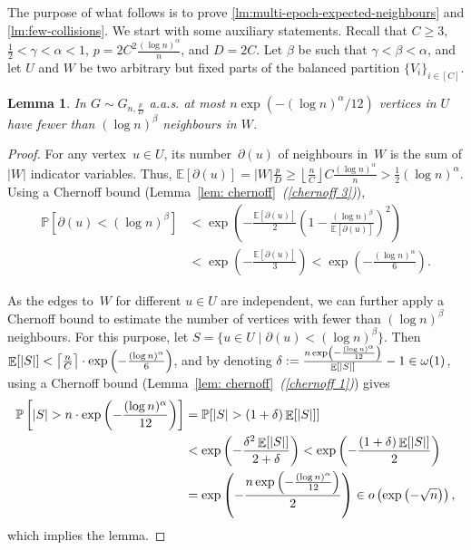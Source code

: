 \documentclass[a4paper,11pt]{article}
\makeatletter
\theoremstyle{definition}
\theoremstyle{plain}
\newtheorem{lemma}{Lemma}
\DeclareMathOperator{\E}{\mathbb{E}}
\newcommand{\prob}{\mathbb{P}}
\newcommand{\expect}{\mathbb{E}}
\newcommand{\aas}{a.a.s.\@\xspace}
\DeclarePairedDelimiter{\abs}{\lvert}{\rvert}
\makeatother
\begin{document}
The purpose of what follows is to prove \cref{lm:multi-epoch-expected-neighbours} and \cref{lm:few-collisions}. 
We start with some auxiliary statements.
Recall that $C \geq 3$, $\frac{1}{2}<\gamma<\alpha<1$, $p = 2C^2 \frac{(\log n)^\alpha}{n}$, and $D = 2C$. Let $\beta$ be such that $\gamma<\beta<\alpha$, and
let $U$ and $W$ be two arbitrary but fixed parts of the balanced partition $\{ V_i \}_{i \in [C]}$.

\begin{lemma}
	\label{lm:few-sleepers}
	In $G \sim G_{n, \frac{p}{D}}$ \aas
	at most $n \exp\left(-(\log n)^\alpha/12\right)$ vertices in $U$ have fewer than $(\log n)^\beta$ neighbours in $W$.
\end{lemma}

\begin{proof}
	For any vertex~$u \in U$, its number~$\partial(u)$ of neighbours in~$W$
	is the sum of $|W|$ indicator variables.
	Thus, 
	$\expect[\partial(u)] = |W| \frac{p}{D}\geq
	\left\lfloor\frac{n}{C}\right\rfloor C \frac{(\log n)^\alpha}{n} 
	>\frac{1}{2}(\log n)^\alpha$.
	Using a Chernoff bound (Lemma~\ref{lem: chernoff}~\emph{(\ref{chernoff 3})}),
	\begin{align*}
		\prob[\partial(u) < (\log n)^\beta]
		&< \exp \left( - \frac{\expect[\partial(u)]}{2} \left(1-\frac{(\log n)^\beta}{\expect[\partial(u)]}\right)^2 \right)
		\\ &< \exp \left( - \frac{\expect[\partial(u)]}{3}\right)
		< \exp \left( - \frac{(\log n)^\alpha}{6} \right).
	\end{align*}
	
	As the edges to~$W$ for different $u \in U$ are independent,
	we can further apply a Chernoff bound to estimate the number of vertices with fewer than $(\log n)^\beta$ neighbours.
	For this purpose, let $S=\{u \in U \mid  \partial(u) < (\log n)^\beta\}$.
	Then $\E[\abs{S}]<\left\lceil \frac{n}{C} \right\rceil \cdot \exp \left( - \frac{(\log n)^\alpha}{6}\right)$, and
	by denoting $\delta := \frac{n \exp \left( - \frac{(\log n)^\alpha}{12} \right)}{\E[\abs{S}]}-1 \in \omega(1)$,
	using a Chernoff bound (Lemma~\ref{lem: chernoff}~\emph{(\ref{chernoff 1})}) gives 
	\begin{align*}
		\prob\left[\abs{S}>n\cdot \exp \left( - \frac{(\log n)^\alpha}{12}\right) \right]
		&=
		\prob[\abs{S}>(1+\delta)\E[\abs{S}]]
		\\&<
		\exp\left(-\frac{\delta^2 \E[\abs{S}]}{2+ \delta}\right)
		<
		\exp\left(-\frac{(1+\delta) \E[\abs{S}]}{2}\right)
		\\ &=
		\exp\left(-\frac{n\exp \left(- \frac{(\log n)^\alpha}{12} \right)}{2}\right)
		\in o\left( \exp\left(-\sqrt{n}\right)\right),
	\end{align*}
	which implies the lemma.
\end{proof}
\end{document}
